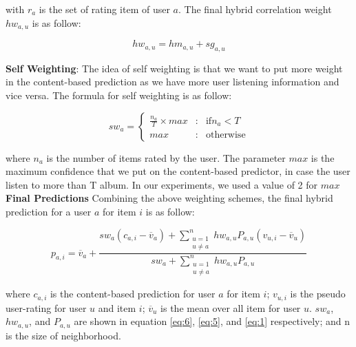 with \(r_a\) is the set of rating item of user \(a\). The final hybrid correlation weight \(hw_{a,u}\) is as follow:

\begin{displaymath}
hw_{a,u} = hm_{a,u} + sg_{a,u} \tag{5} \label{eq:5}
\end{displaymath}

\noindent \textbf{Self Weighting}: The idea of self weighting is that we want to put more weight in the content-based prediction as we have more user listening information and vice versa. The formula for self weighting is as follow:

\begin{displaymath}
sw_a = \left\{ \begin{array}{lcl}
\frac{n_a}{T} \times max & \mbox{:} & \text{if} n_a < T \\
max & \mbox{:} & \text{otherwise}
\end{array}
\right. \tag{6} \label{eq:6}
\end{displaymath}

where \(n_a\) is the number of items rated by the user. The parameter \(max\) is the maximum confidence that we put on the content-based predictor, in case the user listen to more than T album. In our experiments, we used a value of 2 for \(max\) \\

\noindent \textbf{Final Predictions} Combining the above weighting schemes, the final hybrid prediction for a user \(a\) for item \(i\) is as follow:

\begin{displaymath}
p_{a,i} = \overline{v}_a + \frac{sw_a \left(c_{a,i} - \overline{v}_a \right) + \sum\limits_{\substack{ u=1 \\ u \neq a}}^{n} hw_{a,u}P_{a,u} \left(v_{u,i} - \overline{v}_u \right) } {sw_a +\sum\limits_{\substack{ u=1 \\ u \neq a}}^{n} hw_{a,u}P_{a,u}}
\end{displaymath}

where \(c_{a,i}\) is the content-based prediction for user \(a\) for item  \(i\); \(v_{u,i}\) is the pseudo user-rating for user \(u\) and item \(i\); \(\overline{v}_u\) is the mean over all item for user \(u\). \(sw_a\), \(hw_{a,u}\), and \(P_{a,u}\) are shown in equation \eqref{eq:6}, \eqref{eq:5}, and \eqref{eq:1} respectively; and n is the size of neighborhood. 